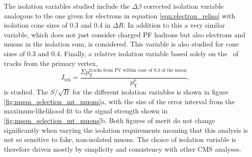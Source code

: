 The isolation variables studied include
the $\Delta\beta$ corrected isolation variable analogous
to the one given for electrons in equation \ref{eqn:electron_reliso} with 
isolation cone sizes of 0.3 and 0.4 in $\Delta R$. In addition
to this a very similar
variable, which does not just consider charged \ac{PF} hadrons but
also electrons and muons in the isolation sum, is considered. This
variable is also studied for cone sizes of 0.3 and 0.4. Finally,
a relative isolation variable based solely on the \pT~of tracks from the primary
vertex,
\begin{equation}\label{eqn:reltrkiso}
I_{\text{trk}} = \frac{\Sigma p_{\text{T}}^{\text{tracks from PV within cone of 0.3 of the muon}}}{p_{\text{T}}^{\mu}}, \end{equation} 
is studied. The $S/\sqrt{B}$ for the different isolation variables is shown in figure \ref{fig:mssm_selection_mt_muons}a, with the
size of the error interval from the maximum-likelihood fit to the \Ztautau signal strength shown in 
\ref{fig:mssm_selection_mt_muons}b. Both figures of merit do not
change significantly when varying the isolation requirements meaning that this analysis
is not so sensitive to fake, non-isolated muons. The choice of isolation variable is therefore
driven mostly by simplicity and consistency with other \ac{CMS} analyses.

